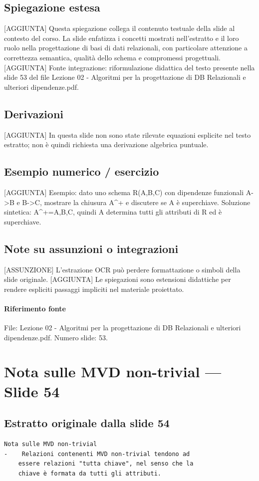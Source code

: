 \documentclass[11pt]{article}
\begin{document}
\subsection*{Spiegazione estesa}
[AGGIUNTA] Questa spiegazione collega il contenuto testuale della slide al contesto del corso. La slide enfatizza i concetti mostrati nell'estratto e il loro ruolo nella progettazione di basi di dati relazionali, con particolare attenzione a correttezza semantica, qualità dello schema e compromessi progettuali.
[AGGIUNTA] Fonte integrazione: riformulazione didattica del testo presente nella slide 53 del file Lezione 02 - Algoritmi per la progettazione di DB Relazionali e ulteriori dipendenze.pdf.
\subsection*{Derivazioni}
[AGGIUNTA] In questa slide non sono state rilevate equazioni esplicite nel testo estratto; non è quindi richiesta una derivazione algebrica puntuale.
\subsection*{Esempio numerico / esercizio}
[AGGIUNTA] Esempio: dato uno schema R(A,B,C) con dipendenze funzionali A->B e B->C, mostrare la chiusura A^+ e discutere se A è superchiave. Soluzione sintetica: A^+={A,B,C}, quindi A determina tutti gli attributi di R ed è superchiave.
\subsection*{Note su assunzioni o integrazioni}
[ASSUNZIONE] L'estrazione OCR può perdere formattazione o simboli della slide originale.
[AGGIUNTA] Le spiegazioni sono estensioni didattiche per rendere espliciti passaggi impliciti nel materiale proiettato.
\paragraph{Riferimento fonte} File: Lezione 02 - Algoritmi per la progettazione di DB Relazionali e ulteriori dipendenze.pdf. Numero slide: 53.
\section{Nota sulle MVD non-trivial --- Slide 54}
\subsection*{Estratto originale dalla slide 54}
\begin{lstlisting}
Nota sulle MVD non-trivial
-    Relazioni contenenti MVD non-trivial tendono ad
    essere relazioni "tutta chiave", nel senso che la
    chiave è formata da tutti gli attributi.
\end{lstlisting}
\end{document}
